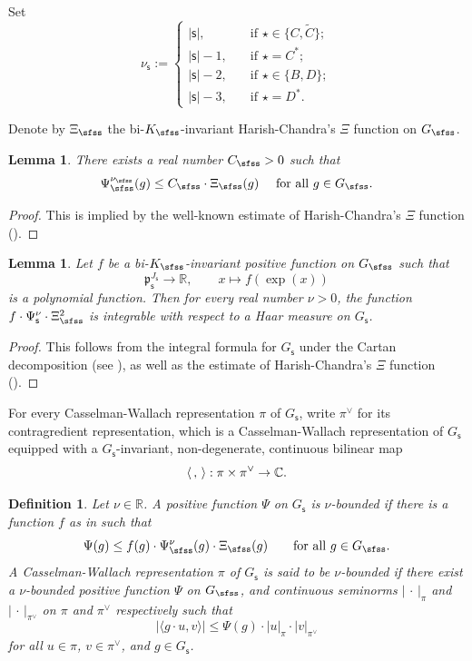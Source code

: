 \documentclass[11pt,a4paper]{amsart}
\def\abs#1{\left|{#1}\right|}
\newcommand{\p}{\mathfrak p}
\newcommand{\R}{\mathbb R}
\newcommand{\la}{\langle}
\newcommand{\ra}{\rangle}
\newcommand{\be}{\begin {equation}}
\newcommand{\ee}{\end {equation}}
\numberwithin{equation}{section}
\newtheorem{lem}[thm]{Lemma}
\newtheorem{defn}[thm]{Definition}
\theoremstyle{remark}
\begin{document}
Set
\be\label{def:nus}
  \nu_\mathsf s:=\begin{cases}
    \abs{\mathsf s},\quad &\textrm{if }\star\in \{C, \widetilde C\};\\
     \abs{\mathsf s}-1,\quad & \textrm{if }\star= C^*;\\
      \abs{\mathsf s}-2,\quad & \textrm{if }\star\in \{B,D\};\\
       \abs{\mathsf s}-3,\quad & \textrm{if }\star= D^*.
  \end{cases}
\ee

Denote by $\Xi_\sfss$ the bi-$K_\sfss$-invariant Harish-Chandra's $\Xi$ function on $G_\sfss$.

\begin{lem}\label{boundpsi}
There exists a real number $C_\sfss>0$ such that
\[
  \Psi_\sfss^{\nu_\sfss}(g)\leq C_\sfss\cdot \Xi_\sfss (g)\quad\textrm{ for all $g\in G_\sfss$}.
\]

\end{lem}
\begin{proof}
This is implied by the well-known  estimate of Harish-Chandra's $\Xi$ function (\cite[Theorem 4.5.3]{Wa1}).
\end{proof}



\begin{lem}\label{int}
Let $f$ be a bi-$K_\sfss$-invariant positive function  on $G_\sfss$  such that
\[
  \p_\mathsf s^{J_\mathsf s}\rightarrow \R, \qquad x\mapsto f(\exp(x))
\]
is a polynomial function. Then for every real number $\nu>0$, the function $f\cdot \Psi_\mathsf s^\nu\cdot \Xi_\sfss^2$ is integrable with respect to a Haar measure on $G_\mathsf s$.
\end{lem}
\begin{proof}
  This follows from the integral formula for $G_\mathsf s$ under the Cartan decomposition (see
 \cite[Lemma 2.4.2]{Wa1}), as well as the  estimate of Harish-Chandra's $\Xi$ function (\cite[Theorem 4.5.3]{Wa1}).
\end{proof}

For every Casselman-Wallach representation $\pi$ of $G_\mathsf s$, write $\pi^\vee$ for its contragredient representation, which is a  Casselman-Wallach representation  of $G_\mathsf s$ equipped with a $G_{\mathsf s}$-invariant, non-degenerate, continuous bilinear map
 \[
   \la\,,\,\ra: \pi \times\pi^\vee\rightarrow \C.
 \]

\begin{defn}
Let $\nu\in \R$.
A  positive function $\Psi$ on $G_\mathsf s$ is $\nu$-bounded if there is
a  function $f$ as in 
such that
\[
  \Psi(g)\leq f(g)\cdot \Psi_{\sfss}^\nu(g)\cdot \Xi_\sfss(g)\qquad \textrm{for all }g\in G_\sfss.
\]
A Casselman-Wallach representation $\pi$ of $G_\mathsf s$ is said to be $\nu$-bounded if there
exist a $\nu$-bounded positive function $\Psi$ on $G_\sfss$, and continuous seminorms $\abs{\,\cdot\,}_{\pi}$ and $\abs{\,\cdot\,}_{\pi^\vee}$ on  $ \pi$ and $\pi^\vee$ respectively such that
\[
 \abs{ \la g \cdot u, v\ra}\leq \Psi(g)\cdot \abs{u}_{\pi}\cdot \abs{v}_{\pi^\vee}
\]
for all $u\in \pi$, $v\in \pi^\vee$, and $g\in G_{\mathsf s}$.

\end{defn}
\end{document}
